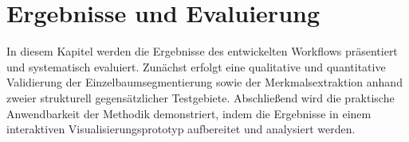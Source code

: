 \section{Ergebnisse und Evaluierung}

In diesem Kapitel werden die Ergebnisse des entwickelten Workflows präsentiert und systematisch evaluiert. Zunächst erfolgt eine qualitative und quantitative Validierung der Einzelbaumsegmentierung sowie der Merkmalsextraktion anhand zweier strukturell gegensätzlicher Testgebiete. Abschließend wird die praktische Anwendbarkeit der Methodik demonstriert, indem die Ergebnisse in einem interaktiven Visualisierungsprototyp aufbereitet und analysiert werden.